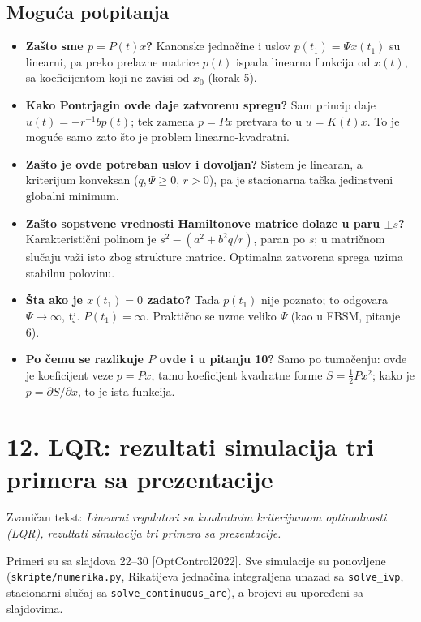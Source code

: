 \documentclass[11pt,a4paper,parskip=half,headsepline,numbers=noenddot]{scrartcl}
\DeclareRobustCommand{\izvor}[1]{{\small\color{izvorC}[#1]}}
\begin{document}
\subsection{Moguća potpitanja}

\begin{itemize}
\item \textbf{Zašto sme \(p = P(t)x\)?} Kanonske jednačine i uslov \(p(t_1) = \Psi x(t_1)\) su linearni, pa preko prelazne matrice \(p(t)\) ispada linearna funkcija od \(x(t)\), sa koeficijentom koji ne zavisi od \(x_0\) (korak 5).
\item \textbf{Kako Pontrjagin ovde daje zatvorenu spregu?} Sam princip daje \(u(t) = -r^{-1}bp(t)\); tek zamena \(p = Px\) pretvara to u \(u = K(t)x\). To je moguće samo zato što je problem linearno-kvadratni.
\item \textbf{Zašto je ovde potreban uslov i dovoljan?} Sistem je linearan, a kriterijum konveksan (\(q, \Psi \ge 0\), \(r > 0\)), pa je stacionarna tačka jedinstveni globalni minimum.
\item \textbf{Zašto sopstvene vrednosti Hamiltonove matrice dolaze u paru \(\pm s\)?} Karakteristični polinom je \(s^2 - (a^2 + b^2q/r)\), paran po \(s\); u matričnom slučaju važi isto zbog strukture matrice. Optimalna zatvorena sprega uzima stabilnu polovinu.
\item \textbf{Šta ako je \(x(t_1) = 0\) zadato?} Tada \(p(t_1)\) nije poznato; to odgovara \(\Psi \to \infty\), tj. \(P(t_1) = \infty\). Praktično se uzme veliko \(\Psi\) (kao u FBSM, pitanje 6).
\item \textbf{Po čemu se razlikuje \(P\) ovde i u pitanju 10?} Samo po tumačenju: ovde je koeficijent veze \(p = Px\), tamo koeficijent kvadratne forme \(S = \frac12Px^2\); kako je \(p = \partial S/\partial x\), to je ista funkcija.
\end{itemize}

\section{12. LQR: rezultati simulacija tri primera sa prezentacije}

Zvaničan tekst: \emph{Linearni regulatori sa kvadratnim kriterijumom optimalnosti (LQR), rezultati simulacija tri primera sa prezentacije.}

Primeri su sa slajdova 22--30 \izvor{OptControl2022}. Sve simulacije su ponovljene (\texttt{skripte/\allowbreak{}numerika.py}, Rikatijeva jednačina integraljena unazad sa \texttt{solve\_ivp}, stacionarni slučaj sa \texttt{solve\_\allowbreak{}continuous\_\allowbreak{}are}), a brojevi su upoređeni sa slajdovima.
\end{document}

